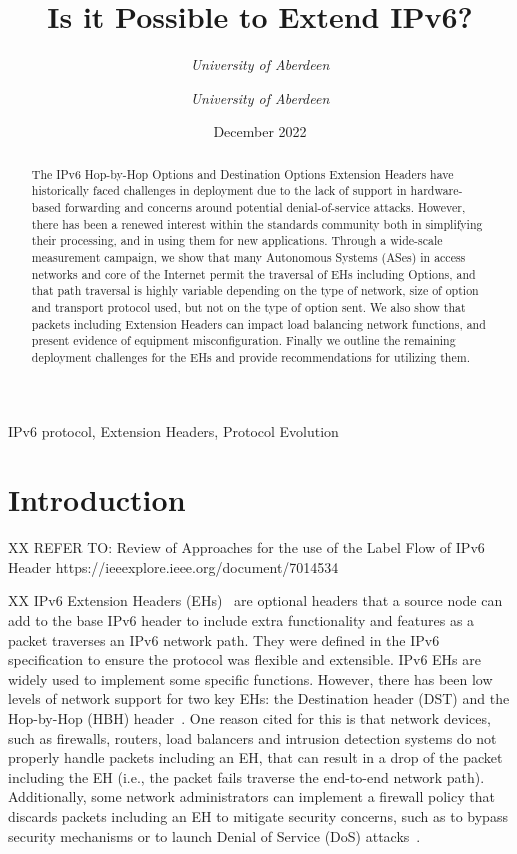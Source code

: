 \documentclass[conference]{IEEEtran}
\title{Is it Possible to Extend IPv6?}
\date{December 2022}
\author{\IEEEauthorblockN{Ana Custura}
\IEEEauthorblockA{
\textit{University of Aberdeen}\\
}
\and
\IEEEauthorblockN{Raffaello Secchi}
\textit{University of Aberdeen}\\
\and
\IEEEauthorblockN{Gorry Fairhurst}
\textit{University of Aberdeen}\\
}
\begin{document}
\maketitle

\begin{abstract}
The IPv6 Hop-by-Hop Options and Destination Options Extension Headers have historically faced challenges in deployment due to the lack of support in hardware-based forwarding and concerns around potential denial-of-service attacks. However, there has been a renewed interest within the standards community both in simplifying their processing, and in using them for new applications. 
Through a wide-scale measurement campaign, we show that many Autonomous Systems (ASes) in access networks and core of the Internet permit the traversal of EHs including Options, and that path traversal is highly variable depending on the type of network, size of option and transport protocol used, but not on the type of option sent. We also show that packets including Extension Headers can impact load balancing network functions, and present evidence of equipment misconfiguration. Finally we outline the remaining deployment challenges for the EHs and provide recommendations for utilizing them.

\end{abstract}

\begin{IEEEkeywords}
IPv6 protocol, Extension Headers, Protocol Evolution
\end{IEEEkeywords}

\section{Introduction}
\label{sec:introduction}

XX 
REFER TO:
Review of Approaches for the use of the Label Flow of IPv6 Header
https://ieeexplore.ieee.org/document/7014534

XX
IPv6 Extension Headers (EHs)~\cite{RFC8200} are optional headers that a source node can
add to the base IPv6 header to include extra functionality and features as a packet traverses an IPv6 network path. They were defined in the IPv6 specification
to ensure the protocol was flexible and extensible.
IPv6 EHs are widely used to implement some specific functions. However, there has been low levels of network support for two key EHs: the Destination header (DST) and the Hop-by-Hop (HBH) header~\cite{rfc9098}. One reason cited for this is that network devices, such as firewalls, routers, load balancers and intrusion detection systems do not properly handle packets including an EH, that can result in a drop of the packet including the EH (i.e., the packet fails traverse the end-to-end network path).
Additionally, some network administrators can implement a firewall policy that discards packets including an EH to mitigate security concerns, such as to bypass
security mechanisms or to launch Denial of Service (DoS) attacks~\cite{naagas2021deh}.
\end{document}
